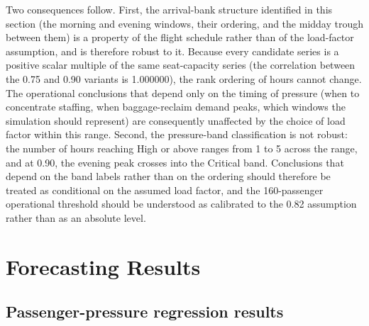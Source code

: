 Two consequences follow. First, the arrival-bank structure identified in this section (the morning and evening windows, their ordering, and the midday trough between them) is a property of the flight schedule rather than of the load-factor assumption, and is therefore robust to it. Because every candidate series is a positive scalar multiple of the same seat-capacity series (the correlation between the 0.75 and 0.90 variants is 1.000000), the rank ordering of hours cannot change. The operational conclusions that depend only on the timing of pressure (when to concentrate staffing, when baggage-reclaim demand peaks, which windows the simulation should represent) are consequently unaffected by the choice of load factor within this range. Second, the pressure-band classification is not robust: the number of hours reaching High or above ranges from 1 to 5 across the range, and at 0.90, the evening peak crosses into the Critical band. Conclusions that depend on the band labels rather than on the ordering should therefore be treated as conditional on the assumed load factor, and the 160-passenger operational threshold should be understood as calibrated to the 0.82 assumption rather than as an absolute level.

\section{Forecasting Results}
\label{sec:forecasting-results}

\subsection{Passenger-pressure regression results}
\label{subsec:passenger-pressure-regression-results}


